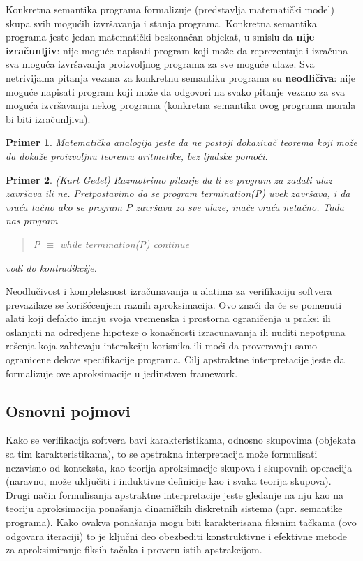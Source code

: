 \documentclass[a4paper]{article}
\newtheorem{primer}{Primer}[section]
\begin{document}
Konkretna semantika programa formalizuje (predstavlja matematički model) skupa svih mogućih izvršavanja i stanja programa. Konkretna semantika programa jeste jedan matematički beskonačan objekat, u smislu da \textbf{nije izračunljiv}: nije moguće napisati program koji može da reprezentuje i izračuna sva moguća izvršavanja proizvoljnog programa za sve moguće ulaze.
Sva netrivijalna pitanja vezana za konkretnu semantiku programa su \textbf{neodličiva}: nije moguće napisati program koji može da odgovori na svako pitanje vezano za sva moguća izvršavanja nekog programa (konkretna semantika ovog programa morala bi biti izračunljiva).

\begin{primer}
Matematička analogija jeste da ne postoji dokazivač teorema koji može da dokaže proizvoljnu teoremu aritmetike, bez ljudske pomoći.
\end{primer}

\begin{primer}
(Kurt Gedel) Razmotrimo pitanje da li se program za zadati ulaz završava ili ne. Pretpostavimo da se program termination(P) uvek završava, i da vraća tačno ako se program P završava za sve ulaze, inače vraća netačno. Tada nas program \begin{quote}
    P $\equiv$ while termination(P) continue
\end{quote} vodi do kontradikcije.
\end{primer} 

Neodlučivost i kompleksnost izračunavanja u alatima za verifikaciju softvera prevazilaze se korišćcenjem raznih aproksimacija. Ovo znači da će se pomenuti alati koji defakto imaju svoja vremenska i prostorna ograničenja u praksi ili oslanjati na odredjene hipoteze o konačnosti izracunavanja ili nuditi nepotpuna rešenja koja zahtevaju interakciju korisnika ili moći da proveravaju samo ogranicene delove specifikacije programa. Cilj apstraktne interpretacije jeste da formalizuje ove aproksimacije u jedinstven framework.\cite{pcusot} \cite{prcousot}

\subsection{Osnovni pojmovi}
    
Kako se verifikacija softvera bavi karakteristikama, odnosno skupovima (objekata sa tim karakteristikama), to se apstrakna interpretacija može formulisati nezavisno od konteksta, kao teorija aproksimacije skupova i skupovnih operaciija (naravno, može uključiti i induktivne definicije kao i svaka teorija skupova). Drugi način formulisanja apstraktne interpretacije jeste gledanje na nju kao na teoriju aproksimacija ponašanja dinamičkih diskretnih sistema (npr. semantike programa). Kako ovakva ponašanja mogu biti karakterisana fiksnim tačkama (ovo odgovara iteraciji) to je ključni deo obezbediti konstruktivne i efektivne metode za aproksimiranje fiksih tačaka i proveru istih apstrakcijom.
\end{document}
